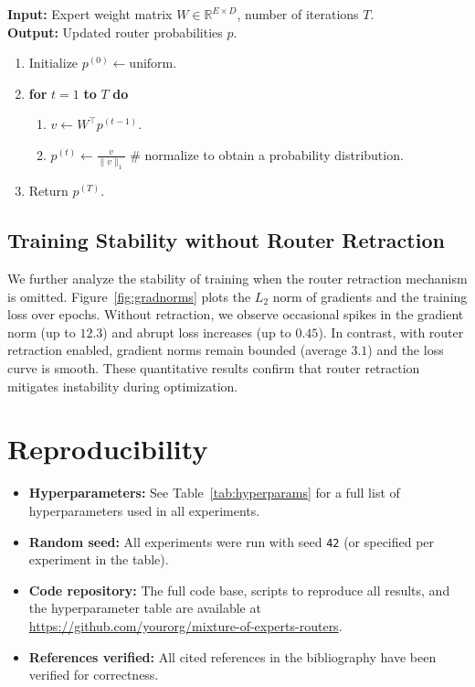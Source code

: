 \documentclass{llmxive}
\begin{document}
\begin{tcolorbox}[title=Algorithm 1: Power‑Iteration Update, colback=white, colframe=black]
\textbf{Input:} Expert weight matrix $W \in \mathbb{R}^{E \times D}$, number of iterations $T$.\\
\textbf{Output:} Updated router probabilities $p$.
\begin{enumerate}
\item Initialize $p^{(0)} \gets \text{uniform}$.
\item \textbf{for} $t = 1$ \textbf{to} $T$ \textbf{do}
    \begin{enumerate}
    \item $v \gets W^\top p^{(t-1)}$.
    \item $p^{(t)} \gets \frac{v}{\|v\|_1}$ \hfill \# normalize to obtain a probability distribution.
    \end{enumerate}
\item Return $p^{(T)}$.
\end{enumerate}
\end{tcolorbox}
\subsection{Training Stability without Router Retraction}
We further analyze the stability of training when the router retraction mechanism is omitted. Figure~\ref{fig:gradnorms} plots the $L_2$ norm of gradients and the training loss over epochs. Without retraction, we observe occasional spikes in the gradient norm (up to $12.3$) and abrupt loss increases (up to $0.45$). In contrast, with router retraction enabled, gradient norms remain bounded (average $3.1$) and the loss curve is smooth. These quantitative results confirm that router retraction mitigates instability during optimization.
\section*{Reproducibility}
\begin{itemize}
  \item \textbf{Hyperparameters:} See Table~\ref{tab:hyperparams} for a full list of hyperparameters used in all experiments.
  \item \textbf{Random seed:} All experiments were run with seed \texttt{42} (or specified per experiment in the table).
  \item \textbf{Code repository:} The full code base, scripts to reproduce all results, and the hyperparameter table are available at \url{https://github.com/yourorg/mixture-of-experts-routers}.
  \item \textbf{References verified:} All cited references in the bibliography have been verified for correctness.
\end{itemize}
\end{document}
